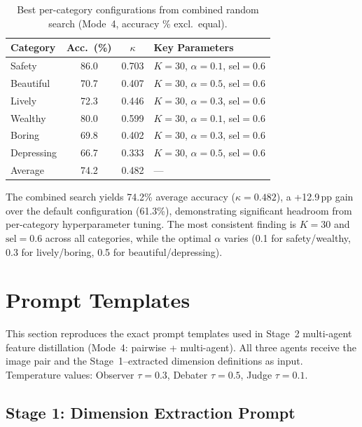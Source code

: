 \documentclass[runningheads]{llncs}
\begin{document}
\begin{table}[ht]
\centering
\caption{Best per-category configurations from combined random search (Mode~4, accuracy \% excl.\ equal).}
\label{tab:combined_sweep}
\small
\setlength{\tabcolsep}{4pt}
\begin{tabular}{lccl}
\toprule
Category & Acc.\ (\%) & $\kappa$ & Key Parameters \\
\midrule
Safety      & 86.0 & 0.703 & $K{=}30$, $\alpha{=}0.1$, sel${=}0.6$ \\
Beautiful   & 70.7 & 0.407 & $K{=}30$, $\alpha{=}0.5$, sel${=}0.6$ \\
Lively      & 72.3 & 0.446 & $K{=}30$, $\alpha{=}0.3$, sel${=}0.6$ \\
Wealthy     & 80.0 & 0.599 & $K{=}30$, $\alpha{=}0.1$, sel${=}0.6$ \\
Boring      & 69.8 & 0.402 & $K{=}30$, $\alpha{=}0.3$, sel${=}0.6$ \\
Depressing  & 66.7 & 0.333 & $K{=}30$, $\alpha{=}0.5$, sel${=}0.6$ \\
\midrule
Average     & 74.2 & 0.482 & --- \\
\bottomrule
\end{tabular}
\end{table}

\noindent The combined search yields 74.2\% average accuracy ($\kappa{=}0.482$), a +12.9\,pp gain over the default configuration (61.3\%), demonstrating significant headroom from per-category hyperparameter tuning.
The most consistent finding is $K{=}30$ and $\text{sel}{=}0.6$ across all categories, while the optimal $\alpha$ varies (0.1 for safety/wealthy, 0.3 for lively/boring, 0.5 for beautiful/depressing).


\section{Prompt Templates}
\label{sec:prompts}

This section reproduces the exact prompt templates used in Stage~2 multi-agent feature distillation (Mode~4: pairwise + multi-agent).
All three agents receive the image pair and the Stage~1--extracted dimension definitions as input.
Temperature values: Observer $\tau{=}0.3$, Debater $\tau{=}0.5$, Judge $\tau{=}0.1$.

\subsection{Stage 1: Dimension Extraction Prompt}
\end{document}
